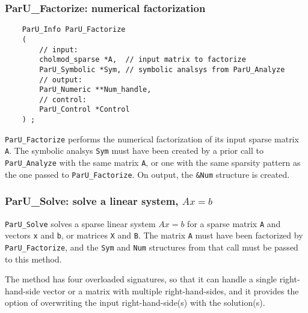 \documentclass[12pt]{article}
\begin{document}
\subsubsection{{\sf ParU\_Factorize}: numerical factorization}

    {\footnotesize
    \begin{verbatim}
    ParU_Info ParU_Factorize
    (
        // input:
        cholmod_sparse *A,  // input matrix to factorize
        ParU_Symbolic *Sym, // symbolic analsys from ParU_Analyze
        // output:
        ParU_Numeric **Num_handle,
        // control:
        ParU_Control *Control
    ) ; \end{verbatim}}

    \verb'ParU_Factorize' performs the numerical factorization of its input
    sparse matrix \verb'A'.  The symbolic analsys \verb'Sym' must have been
    created by a prior call to \verb'ParU_Analyze' with the same matrix
    \verb'A', or one with the same sparsity pattern as the one passed to
    \verb'ParU_Factorize'.  On output, the \verb'&Num' structure is created.

\subsubsection{{\sf ParU\_Solve}: solve a linear system, $Ax=b$}

    \verb'ParU_Solve' solves a sparse linear system $Ax=b$ for a sparse
    matrix \verb'A' and vectors \verb'x' and \verb'b', or matrices
    \verb'X' and \verb'B'.  The matrix \verb'A' must have been factorized
    by \verb'ParU_Factorize', and the \verb'Sym' and \verb'Num' structures
    from that call must be passed to this method.

    The method has four overloaded signatures, so that it can handle a single
    right-hand-side vector or a matrix with multiple right-hand-sides, and it
    provides the option of overwriting the input right-hand-side(s) with the
    solution(s).
\end{document}
